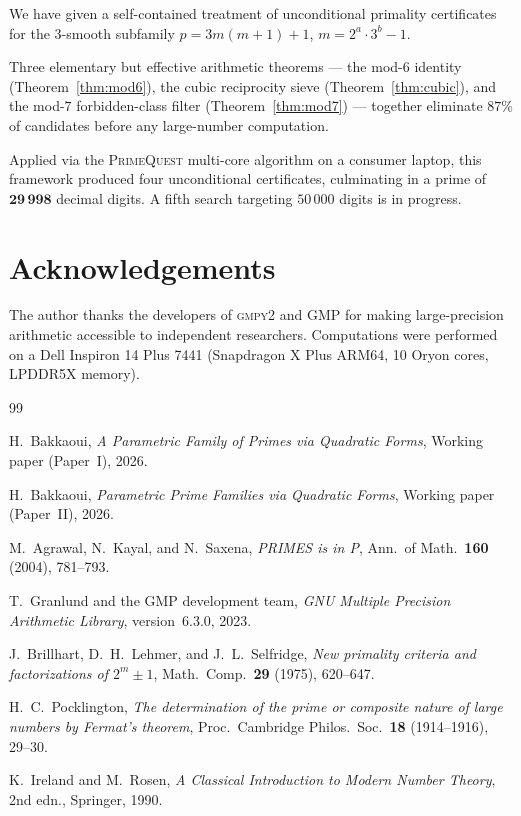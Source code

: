 \documentclass[11pt,a4paper]{article}
\theoremstyle{definition}
\theoremstyle{remark}
\begin{document}
We have given a self-contained treatment of unconditional primality
certificates for the 3-smooth subfamily $p=3m(m+1)+1$, $m=2^a\cdot 3^b-1$.

Three elementary but effective arithmetic theorems — the mod-$6$ identity
(Theorem~\ref{thm:mod6}), the cubic reciprocity sieve
(Theorem~\ref{thm:cubic}), and the mod-$7$ forbidden-class filter
(Theorem~\ref{thm:mod7}) — together eliminate $87\%$ of candidates
before any large-number computation.

Applied via the \textsc{PrimeQuest} multi-core algorithm on a consumer
laptop, this framework produced four unconditional certificates, culminating
in a prime of $\mathbf{29\,998}$ decimal digits. A fifth search targeting
$50\,000$ digits is in progress.

\section*{Acknowledgements}

The author thanks the developers of \textsc{gmpy2} and GMP for making
large-precision arithmetic accessible to independent researchers.
Computations were performed on a Dell Inspiron 14 Plus 7441
(Snapdragon X Plus ARM64, 10 Oryon cores, LPDDR5X memory).

\begin{thebibliography}{99}

H.~Bakkaoui, \emph{A Parametric Family of Primes via Quadratic Forms},
Working paper (Paper~I), 2026.

H.~Bakkaoui, \emph{Parametric Prime Families via Quadratic Forms},
Working paper (Paper~II), 2026.

M.~Agrawal, N.~Kayal, and N.~Saxena, \emph{PRIMES is in P},
Ann.\ of Math.\ \textbf{160} (2004), 781--793.

T.~Granlund and the GMP development team,
\emph{GNU Multiple Precision Arithmetic Library}, version~6.3.0, 2023.

J.~Brillhart, D.~H.~Lehmer, and J.~L.~Selfridge, \emph{New primality
criteria and factorizations of $2^m\pm 1$},
Math.\ Comp.\ \textbf{29} (1975), 620--647.

H.~C.~Pocklington, \emph{The determination of the prime or composite
nature of large numbers by Fermat's theorem},
Proc.\ Cambridge Philos.\ Soc.\ \textbf{18} (1914--1916), 29--30.

K.~Ireland and M.~Rosen, \emph{A Classical Introduction to Modern
Number Theory}, 2nd edn., Springer, 1990.

\end{thebibliography}
\end{document}
